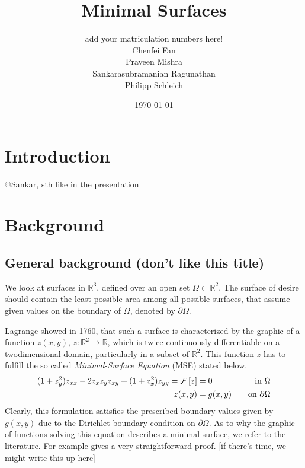 \documentclass[11pt]{scrartcl}
\title{Minimal Surfaces}
\author{add your matriculation numbers here!\\Chenfei Fan \\  Praveen Mishra \\ Sankarasubramanian Ragunathan\\ Philipp Schleich\quad 391779}
\date{\today \\ \vspace{0.9cm}}
\newcommand{\mSurf}[1]{\ensuremath{\mathcal{F}\left[#1\right]}}
\begin{document}
\maketitle

%
\clearpage
\protect \tableofcontents



\newpage
	
\onehalfspacing
\section{Introduction}
@Sankar, sth like in the presentation
\section{Background}
\subsection{General background (don't like this title)}
We look at surfaces in $ \mathbb{R}^3 $, defined over an open set $\Omega \subset \mathbb{R}^2$. 
The surface of desire should contain the least possible area among all possible surfaces, that assume given values on the boundary of $\Omega$, denoted by $\partial \Omega$. \cite{Sakai1976}

Lagrange showed in 1760, that such a surface is characterized by the graphic of a function $z(x,y)$, $z: \mathbb{R}^2 \to \mathbb{R} $, which is twice continuously differentiable on a twodimensional domain, particularly in a subset of $\mathbb{R}^2$.
This function $z$ has to fulfill the so called \textit{Minimal-Surface Equation} (MSE) stated below.
\begin{align}\label{eq:MSE}
	(1+z_y^2) z_{xx} - 2 z_x z_y z_{xy} + (1+z_x^2)z_{yy} = \mSurf{z} &= 0 \quad &\text{in } \Omega \\
	z(x,y) &= g(x,y) \quad &\text{on } \partial \Omega \notag
\end{align}
Clearly, this formulation satisfies the prescribed boundary values given by $g(x,y)$ due to the Dirichlet boundary condition on $\partial\Omega$.
As to why the graphic of functions solving this equation describes a minimal surface, we refer to the literature. For example \cite{Sakai1976} gives a very straightforward proof. [if there's time, we might write this up here]
\end{document}
